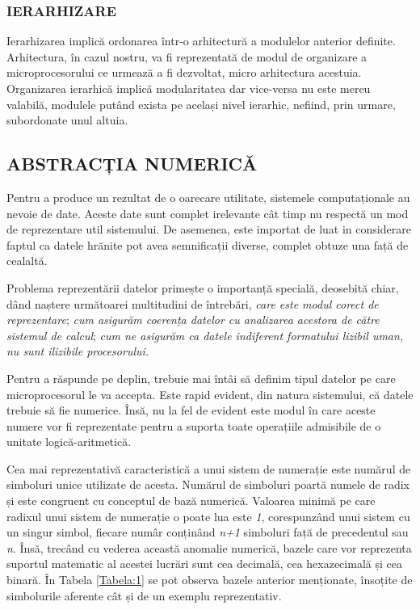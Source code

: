 \documentclass[12pt]{article}
\begin{document}
\subsubsection{IERARHIZARE}
Ierarhizarea implică ordonarea într-o arhitectură a modulelor anterior definite. Arhitectura, în cazul nostru, va fi reprezentată de modul de organizare a microprocesorului ce urmează a fi dezvoltat, micro arhitectura acestuia. Organizarea ierarhică implică modularitatea dar vice-versa nu este mereu valabilă, modulele putând exista pe același nivel ierarhic, nefiind, prin urmare, subordonate unul altuia.

\subsection{ABSTRACȚIA NUMERICĂ}
Pentru a produce un rezultat de o oarecare utilitate, sistemele computaționale au nevoie de date. Aceste date sunt complet irelevante cât timp nu respectă un mod de reprezentare util sistemului. De asemenea, este importat de luat in considerare faptul ca datele hrănite pot avea semnificații diverse, complet obtuze una față de cealaltă.


Problema reprezentării datelor primește o importanță specială, deosebită chiar, dând naștere următoarei multitudini de întrebări, \textit{care este modul corect de reprezentare}; \textit{cum asigurăm coerența datelor cu analizarea acestora de către sistemul de calcul}; \textit{cum ne asigurăm ca datele indiferent formatului lizibil uman, nu sunt ilizibile procesorului.}


Pentru a răspunde pe deplin, trebuie mai întâi să definim tipul datelor pe care microprocesorul le va accepta. Este rapid evident, din natura sistemului, că datele trebuie să fie numerice. Însă, nu la fel de evident este modul în care aceste numere vor fi reprezentate pentru a suporta toate operațiile admisibile de o unitate logică-aritmetică.

Cea mai reprezentativă caracteristică a unui sistem de numerație este numărul de simboluri unice utilizate de acesta. Numărul de simboluri poartă numele de radix și este congruent cu conceptul de bază numerică. Valoarea minimă pe care radixul unui sistem de numerație o poate lua este \textit{1}, corespunzând unui sistem cu un singur simbol, fiecare numâr conținând \textit{n+1} simboluri față de precedentul sau \textit{n}. Însă, trecând cu vederea această anomalie numerică, bazele care vor reprezenta suportul matematic al acestei lucrări sunt cea decimală, cea hexazecimală și cea binară. În Tabela \ref{Tabela:1} se pot observa bazele anterior menționate, însoțite de simbolurile aferente cât și de un exemplu reprezentativ.
\end{document}
